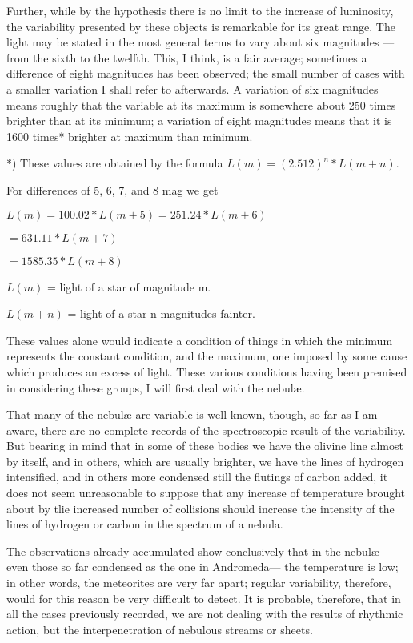 \documentclass[a4paper, 12pt, oneside, polutonikogreek, english]{article}
\begin{document}
Further, while by the hypothesis there is no limit to the increase of luminosity, the variability presented by these objects is remarkable for its great range. The light may be stated in the most general terms to vary about six magnitudes --- from the sixth to the twelfth. This, I think, is a fair average; sometimes a difference of eight magnitudes has been observed; the small number of cases with a smaller variation I shall refer to afterwards. A variation of six magnitudes means roughly that the variable at its maximum is somewhere about 250 times brighter than at its minimum; a variation of eight magnitudes means that it is 1600 times* brighter at maximum than minimum.

*) These values are obtained by the formula $L(m) = (2.512)^n * L(m+n)$.

For differences of 5, 6, 7, and 8 mag we get

$L(m) = 100.02 * L(m+5) = 251.24 * L(m+6)$

$= 631.11 * L(m+7)$

$= 1585.35 * L(m+8)$

$L(m)$ = light of a star of magnitude m.

$L(m+n)$ = light of a star n magnitudes fainter.

These values alone would indicate a condition of things in which the minimum represents the constant condition, and the maximum, one imposed by some cause which produces an excess of light. These various conditions having been premised in considering these groups, I will first deal with the nebulæ.

That many of the nebulæ are variable is well known, though, so far as I am aware, there are no complete records of the spectroscopic result of the variability. But bearing in mind that in some of these bodies we have the olivine line almost by itself, and in others, which are usually brighter, we have the lines of hydrogen intensified, and in others more condensed still the flutings of carbon added, it does not seem unreasonable to suppose that any increase of temperature brought about by tlie increased number of collisions should increase the intensity of the lines of hydrogen or carbon in the spectrum of a nebula.

The observations already accumulated show conclusively that in the nebulæ --- even those so far condensed as the one in Andromeda--- the temperature is low; in other words, the meteorites are very far apart; regular variability, therefore, would for this reason be very difficult to detect. It is probable, therefore, that in all the cases previously recorded, we are not dealing with the results of rhythmic action, but the interpenetration of nebulous streams or sheets.
\end{document}
